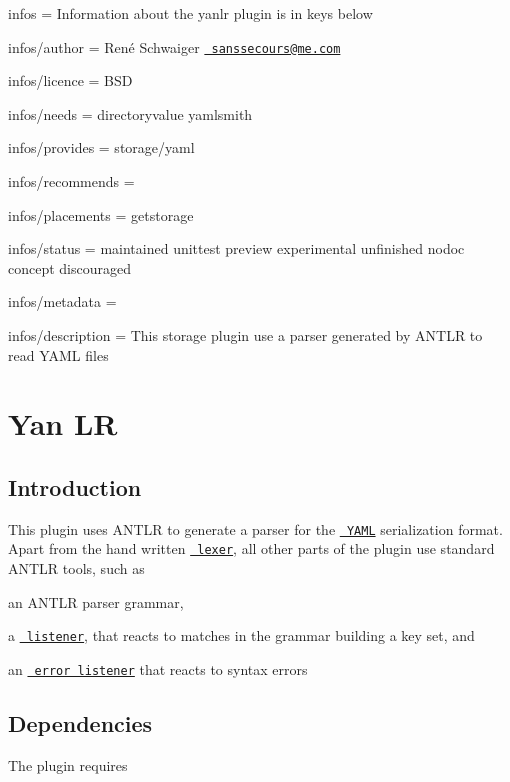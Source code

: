 
\begin{DoxyItemize}
\item infos = Information about the yanlr plugin is in keys below
\item infos/author = René Schwaiger \href{mailto:sanssecours@me.com}{\texttt{ sanssecours@me.\+com}}
\item infos/licence = B\+SD
\item infos/needs = directoryvalue yamlsmith
\item infos/provides = storage/yaml
\item infos/recommends =
\item infos/placements = getstorage
\item infos/status = maintained unittest preview experimental unfinished nodoc concept discouraged
\item infos/metadata =
\item infos/description = This storage plugin use a parser generated by A\+N\+T\+LR to read Y\+A\+ML files
\end{DoxyItemize}\hypertarget{autotoc_md861_src_plugins_yanlr_README_md}{}\section{Yan LR}\label{autotoc_md861_src_plugins_yanlr_README_md}
\hypertarget{autotoc_md861_autotoc_md862}{}\subsection{Introduction}\label{autotoc_md861_autotoc_md862}
This plugin uses A\+N\+T\+LR to generate a parser for the \href{http://yaml.org}{\texttt{ Y\+A\+ML}} serialization format. Apart from the hand written \href{/home/mpranj/workspace/libelektra/src/plugins/yanlr/yaml_lexer.cpp}{\texttt{ lexer}}, all other parts of the plugin use standard A\+N\+T\+LR tools, such as


\begin{DoxyItemize}
\item an A\+N\+T\+LR parser grammar,
\item a \href{/home/mpranj/workspace/libelektra/src/plugins/yanlr/listener.cpp}{\texttt{ listener}}, that reacts to matches in the grammar building a key set, and
\item an \href{/home/mpranj/workspace/libelektra/src/plugins/yanlr/error_listener.cpp}{\texttt{ error listener}} that reacts to syntax errors
\end{DoxyItemize}\hypertarget{autotoc_md861_autotoc_md863}{}\subsection{Dependencies}\label{autotoc_md861_autotoc_md863}
The plugin requires


